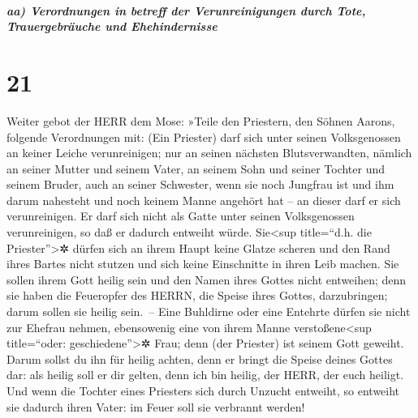 \hypertarget{aa-verordnungen-in-betreff-der-verunreinigungen-durch-tote-trauergebruxe4uche-und-ehehindernisse}{%
\subparagraph{aa) Verordnungen in betreff der Verunreinigungen durch
Tote, Trauergebräuche und
Ehehindernisse}\label{aa-verordnungen-in-betreff-der-verunreinigungen-durch-tote-trauergebruxe4uche-und-ehehindernisse}}

\hypertarget{section-20}{%
\section{21}\label{section-20}}

Weiter gebot der HERR dem Mose: »Teile den Priestern, den
Söhnen Aarons, folgende Verordnungen mit: (Ein Priester) darf sich unter
seinen Volksgenossen an keiner Leiche verunreinigen; nur
an seinen nächsten Blutsverwandten, nämlich an seiner Mutter und seinem
Vater, an seinem Sohn und seiner Tochter und seinem Bruder,
auch an seiner Schwester, wenn sie noch Jungfrau ist und
ihm darum nahesteht und noch keinem Manne angehört hat -- an dieser darf
er sich verunreinigen. Er darf sich nicht als Gatte unter
seinen Volksgenossen verunreinigen, so daß er dadurch entweiht würde.
Sie\textless sup title=``d.h. die Priester''\textgreater✲
dürfen sich an ihrem Haupt keine Glatze scheren und den Rand ihres
Bartes nicht stutzen und sich keine Einschnitte in ihren Leib machen.
Sie sollen ihrem Gott heilig sein und den Namen ihres
Gottes nicht entweihen; denn sie haben die Feueropfer des HERRN, die
Speise ihres Gottes, darzubringen; darum sollen sie heilig sein.~--
Eine Buhldirne oder eine Entehrte dürfen sie nicht zur
Ehefrau nehmen, ebensowenig eine von ihrem Manne verstoßene\textless sup
title=``oder: geschiedene''\textgreater✲ Frau; denn (der Priester) ist
seinem Gott geweiht. Darum sollst du ihn für heilig
achten, denn er bringt die Speise deines Gottes dar: als heilig soll er
dir gelten, denn ich bin heilig, der HERR, der euch heiligt.
Und wenn die Tochter eines Priesters sich durch Unzucht
entweiht, so entweiht sie dadurch ihren Vater: im Feuer soll sie
verbrannt werden!

